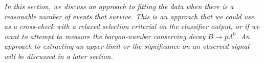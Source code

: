 
{\it In this section, we discuss an approach to fitting the data when there is a reasonable
number of events that survive. This is an approach that we could use as a cross-check
with a relaxed selection criterial on the classifier output, or if we want to attempt to 
measure the baryon-number conserving decay $B \rightarrow \bar{p} \Lambda^0$. An approach 
to extracting an upper limit or the significance on an observed signal will be discussed
in a later section.}\\


